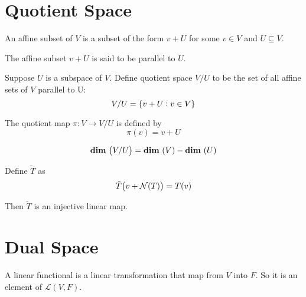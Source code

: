 %
%
%
%
\section{Quotient Space}

\begin{definition}
    An affine subset of $V$ is a subset of the form $v + U$ for some $v\in V$ and $U \subseteq V$.
    
    The affine subset $v+U$ is said to be parallel to $U$.
\end{definition}

\begin{definition}
    Suppose $U$ is a subspace of $V$. Define quotient space $V/U$ to be the set of all affine sets of $V$ parallel to U:
    \begin{equation}
        V/U = \set{v + U: v \in V}
    \end{equation}
\end{definition}

\begin{definition}
    The quotient map $\pi : V \rightarrow V/U$ is defined by 
    \begin{equation}
        \pi(v) = v + U
    \end{equation}
\end{definition}

\begin{theorem}
    \begin{equation}
        \dimension{V/U} = \dimension{V} - \dimension{U}
    \end{equation}    
\end{theorem}

\begin{theorem}
    Define $\tilde{T}$ as 
    \begin{equation}
        \tilde{T}\mleft(v + \nullspace{T}\mright) = T(v)
    \end{equation}
    
    Then $\tilde{T}$ is an injective linear map.
\end{theorem}




%
%
%
%

\section{Dual Space}

\begin{definition}
	A linear functional is a linear transformation that map from $V$ into $F$. So it is an element of $\mathcal{L}(V, F)$.
\end{definition}


